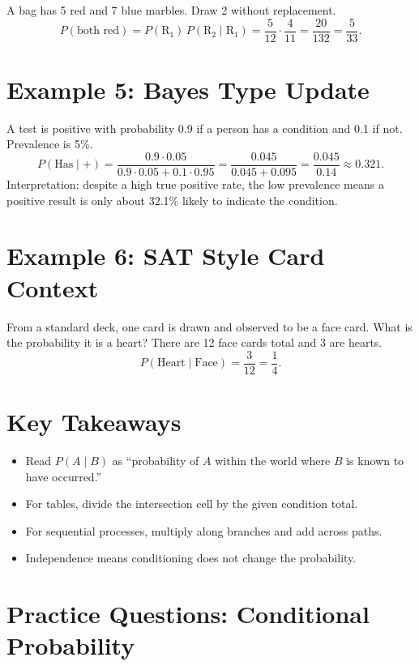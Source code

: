 \documentclass[14pt]{extarticle}
\begin{document}
A bag has 5 red and 7 blue marbles. Draw 2 without replacement.  
\[
P(\text{both red})=P(\text{R}_1)\,P(\text{R}_2\mid \text{R}_1)=\frac{5}{12}\cdot\frac{4}{11}=\frac{20}{132}=\frac{5}{33}.
\]

\section*{Example 5: Bayes Type Update}

A test is positive with probability 0.9 if a person has a condition and 0.1 if not. Prevalence is 5\%.  
\[
P(\text{Has}\mid +)=\frac{0.9\cdot0.05}{0.9\cdot0.05+0.1\cdot0.95}
=\frac{0.045}{0.045+0.095}=\frac{0.045}{0.14}\approx 0.321.
\]
Interpretation: despite a high true positive rate, the low prevalence means a positive result is only about 32.1\% likely to indicate the condition.

\section*{Example 6: SAT Style Card Context}

From a standard deck, one card is drawn and observed to be a face card. What is the probability it is a heart?  
There are 12 face cards total and 3 are hearts.  
\[
P(\text{Heart}\mid \text{Face})=\frac{3}{12}=\frac{1}{4}.
\]

\section*{Key Takeaways}
\begin{itemize}
  \item Read \(P(A\mid B)\) as “probability of \(A\) within the world where \(B\) is known to have occurred.”
  \item For tables, divide the intersection cell by the given condition total.
  \item For sequential processes, multiply along branches and add across paths.
  \item Independence means conditioning does not change the probability.
\end{itemize}

\newpage


\section*{Practice Questions: Conditional Probability}
\end{document}
